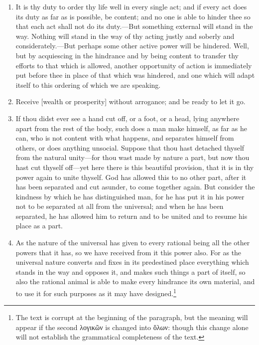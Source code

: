 \begin{enumerate}
\item It is thy duty to order thy life well in every single act; and if every act does its duty as far as is possible, be content; and no one is able to hinder thee so that each act shall not do its duty.—But something external will stand in the way. Nothing will stand in the way of thy acting justly and soberly and considerately.—But perhaps some other active power will be hindered. Well, but by acquiescing in the hindrance and by being content to transfer thy efforts to that which is allowed, another opportunity of action is immediately put before thee in place of that which was hindered, and one which will adapt itself to this ordering of which we are speaking.

\item Receive [{\clarify wealth or prosperity}] without arrogance; and be ready to let it go.

\item If thou didst ever see a hand cut off, or a foot, or a head, lying anywhere apart from the rest of the body, such does a man make himself, as far as he can, who is not content with what happens, and separates himself from others, or does anything unsocial. Suppose that thou hast detached thyself from the natural unity—for thou wast made by nature a part, but now thou hast cut thyself off—yet here there is this beautiful provision, that it is in thy power again to unite thyself. God has allowed this to no other part, after it has been separated and cut asunder, to come together again. But consider the kindness by which he has distinguished man, for he has put it in his power not to be separated at all from the universal; and when he has been separated, he has allowed him to return and to be united and to resume his place as a part.

\item As the nature of the universal has given to every rational being all the other powers that it has, so we have received from it this power also. For as the universal nature converts and fixes in its predestined place everything which stands in the way and opposes it, and makes such things a part of itself, so also the rational animal is able to make every hindrance its own material, and to use it for such purposes as it may have designed.\footnote{The text is corrupt at the beginning of the paragraph, but the meaning will appear if the second \textgreek{λογικῶν} is changed into \textgreek{ὅλων}: though this change alone will not establish the grammatical completeness of the text.}


\end{enumerate}
